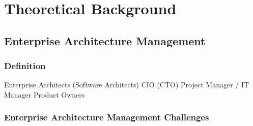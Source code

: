 
\chapter{Theoretical Background}\label{chapter:theoretical background}

\section{Enterprise Architecture Management} 

\subsection{Definition}

Enterprise Architects (Software Architects)
CIO (CTO)
Project Manager / IT Manager
Product Owners




\subsection{Enterprise Architecture Management Challenges}








